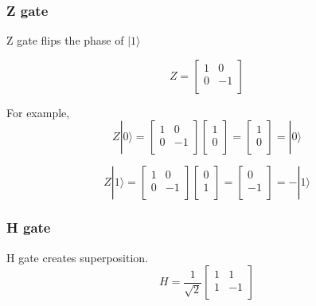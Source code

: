 \subsubsection{Z gate}

Z gate flips the phase of $ |1\rangle$

\begin{equation}
 Z = \begin{bmatrix}
1 & 0 \\
0 & -1 \\
\end{bmatrix}
\end{equation}

For example,
\begin{equation}
 Z|0\rangle = \begin{bmatrix}
1 & 0 \\
0 & -1 \\
\end{bmatrix} 
\left[
\begin{array}{c}
1 \\
0 \\
\end{array}
\right]
= \left[
\begin{array}{c}
1 \\
0 \\
\end{array}
\right]
= |0\rangle
\end{equation}

\begin{equation}
Z|1\rangle = \begin{bmatrix}
1 & 0 \\
0 & -1 \\
\end{bmatrix} 
\left[
\begin{array}{c}
0 \\
1  \\
\end{array}
\right]
= \left[
\begin{array}{c}
0 \\
-1 \\
\end{array}
\right]
= -|1\rangle
\end{equation}

\subsubsection{H gate}

H gate creates superposition.
\begin{equation}
 H = \frac{1}{\sqrt{2}}\begin{bmatrix}
1 & 1\\
1 & -1 \\
\end{bmatrix}
\end{equation}

